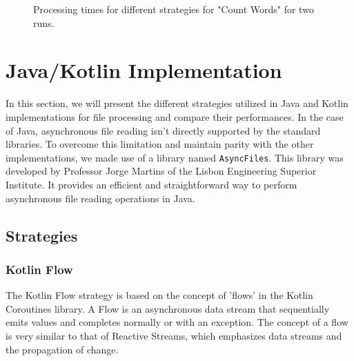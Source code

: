 \begin{figure}[H]
    \raggedright
    \caption{Processing times for different strategies for "Count Words" for two runs.}
    \label{fig:count_words_processing_times}
\end{figure}


\section{Java/Kotlin Implementation}
\label{sec:java_implementation}

In this section, we will present the different strategies utilized in Java and Kotlin implementations for file processing and compare their performances. In the case of Java, asynchronous file reading isn't directly supported by the standard libraries. To overcome this limitation and maintain parity with the other implementations, we made use of a library named \texttt{AsyncFiles}. This library was developed by Professor Jorge Martins of the Lisbon Engineering Superior Institute. It provides an efficient and straightforward way to perform asynchronous file reading operations in Java.

\subsection{Strategies}
\label{subsec:strategies}


\subsubsection{Kotlin Flow}
\label{subsubsec:kotlin_flow}
The Kotlin Flow strategy is based on the concept of 'flows' in the Kotlin Coroutines library. A Flow is an asynchronous data stream that sequentially emits values and completes normally or with an exception. The concept of a flow is very similar to that of Reactive Streams, which emphasizes data streams and the propagation of change.

